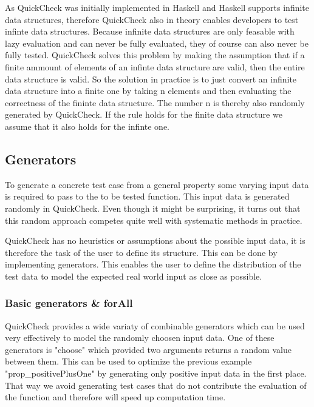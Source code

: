 \documentclass[a4paper, 12pt]{article} %
\begin{document}
As QuickCheck was initially implemented in Haskell and Haskell supports infinite data structures, therefore QuickCheck also in theory enables developers to test infinte data structures. Because infinite data structures are only feasable with lazy evaluation and can never be fully evaluated, they of course can also never be fully tested. QuickCheck solves this problem by making the assumption that if a finite ammount of elements of an infinte data structure are valid, then the entire data structure is valid. So the solution in practice is to just convert an infinite data structure into a finite one by taking n elements and then evaluating the correctness of the fininte data structure. The number n is thereby also randomly generated by QuickCheck. If the rule holds for the finite data structure we assume that it also holds for the infinte one. \cite{Claessen2000}

\subsection{Generators}

To generate a concrete test case from a general property some varying input data is required to pass to the to be tested function. This input data is generated randomly in QuickCheck. Even though it might be surprising, it turns out that this random approach competes quite well with systematic methods in practice. \cite{Claessen2000}

QuickCheck has no heuristics or assumptions about the possible input data, it is therefore the task of the user to define its structure. This can be done by implementing generators. This enables the user to define the distribution of the test data to model the expected real world input as close as possible.


\subsubsection{Basic generators \& forAll}

QuickCheck provides a wide variaty of combinable generators which can be used very effectively to model the randomly choosen input data. One of these generators is "choose" which provided two arguments returns a random value between them. This can be used to optimize the previous example "prop\_positivePlusOne" by generating only positive input data in the first place. That way we avoid generating test cases that do not contribute the evaluation of the function and therefore will speed up computation time. 
\end{document}
